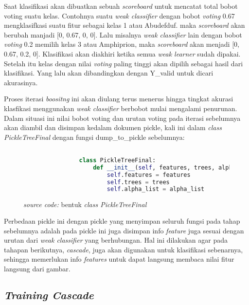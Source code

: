 		Saat klasifikasi akan dibuatkan sebuah \emph{scoreboard} untuk mencatat total bobot voting 
		suatu kelas. Contohnya suatu \emph{weak classifier} dengan bobot \textit{voting} 0.67 
		mengklasifkasi suatu fitur sebagai kelas 1 atau Abudefduf. maka \emph{scoreboard} akan 
		berubah manjadi [0, 0.67, 0, 0]. Lalu misalnya \emph{weak classifier} lain dengan bobot 
		\textit{voting} 0.2 memilih kelas 3 atau Amphiprion, maka \emph{scoreboard} akan menjadi 
		[0, 0.67, 0.2, 0]. Klasifikasi akan diakhiri ketika semua \emph{weak learner} sudah 
		dipakai. Setelah itu kelas dengan nilai \textit{voting} paling tinggi akan dipilih sebagai 
		hasil dari klasifikasi. Yang lalu akan dibandingkan dengan Y\_valid untuk dicari akurasinya.

		Proses iterasi \emph{boositng} ini akan diulang terus menerus hingga tingkat akurasi klasfikasi 
		menggunakan \emph{weak classifier} berbobot mulai mengalami penurunan. Dalam situasi ini 
		nilai bobot voting dan urutan voting pada iterasi sebelumnya akan diambil dan disimpan 
		kedalam dokumen pickle, kali ini dalam \emph{class PickleTreeFinal} dengan fungsi 
		dump\_to\_pickle sebelumnya:

		\begin{figure}[H]
			\begin{lstlisting}[language=Python, basicstyle=\tiny]

				class PickleTreeFinal:
					def __init__(self, features, trees, alpha_list):
						self.features = features
						self.trees = trees
						self.alpha_list = alpha_list

			\end{lstlisting}
			\caption{\emph{source code:} bentuk \textit{class PickleTreeFinal}}
			\label{code: PickleTreeFinal class}
		\end{figure}

		Perbedaan pickle ini dengan pickle yang menyimpan seluruh fungsi pada tahap sebelumnya 
		adalah pada pickle ini juga disimpan info \emph{feature} juga sesuai dengan urutan dari 
		\emph{weak classifier} yang berhubungan. Hal ini dilakukan agar pada tahapan berikutnya, 
		\emph{cascade}, juga akan digunakan untuk klasifikasi sebenarnya, sehingga memerlukan info 
		\emph{features} untuk dapat langsung membaca nilai fitur langsung dari gambar.

	\subsection{\textit{Training Cascade}}
		
